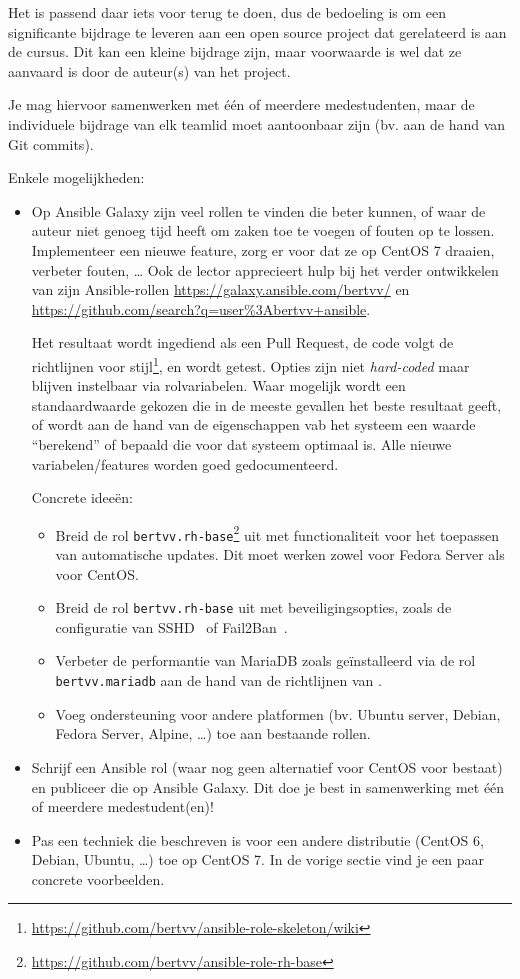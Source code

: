 Het is passend daar iets voor terug te doen, dus de bedoeling is om een significante bijdrage te leveren aan een open source project dat gerelateerd is aan de cursus. Dit kan een kleine bijdrage zijn, maar voorwaarde is wel dat ze aanvaard is door de auteur(s) van het project.

Je mag hiervoor samenwerken met één of meerdere medestudenten, maar de individuele bijdrage van elk teamlid moet aantoonbaar zijn (bv. aan de hand van Git commits).

Enkele mogelijkheden:

\begin{itemize}
\item Op Ansible Galaxy zijn veel rollen te vinden die beter kunnen, of waar de auteur niet genoeg tijd heeft om zaken toe te voegen of fouten op te lossen. Implementeer een nieuwe feature, zorg er voor dat ze op CentOS 7 draaien, verbeter fouten, \ldots{} Ook de lector apprecieert hulp bij het verder ontwikkelen van zijn Ansible-rollen \url{https://galaxy.ansible.com/bertvv/} en \url{https://github.com/search?q=user\%3Abertvv+ansible}.

  Het resultaat wordt ingediend als een Pull Request, de code volgt de richtlijnen voor stijl\footnote{\url{https://github.com/bertvv/ansible-role-skeleton/wiki}}, en wordt getest. Opties zijn niet \emph{hard-coded} maar blijven instelbaar via rolvariabelen. Waar mogelijk wordt een standaardwaarde gekozen die in de meeste gevallen het beste resultaat geeft, of wordt aan de hand van de eigenschappen vab het systeem een waarde ``berekend'' of bepaald die voor dat systeem optimaal is. Alle nieuwe variabelen/features worden goed gedocumenteerd.

  Concrete ideeën:

  \begin{itemize}
    \item Breid de rol \texttt{bertvv.rh-base}\footnote{\url{https://github.com/bertvv/ansible-role-rh-base}} uit met functionaliteit voor het toepassen van automatische updates. Dit moet werken zowel voor Fedora Server als voor CentOS.
    \item Breid de rol \texttt{bertvv.rh-base} uit met beveiligingsopties, zoals de configuratie van SSHD~\autocite{stribika2015,Maundalexis2016} of Fail2Ban~\autocite{Sawiyati2014}.
    \item Verbeter de performantie van MariaDB zoals geïnstalleerd via de rol \texttt{bertvv.mariadb} aan de hand van de richtlijnen van \textcite{Aun2016}.
    \item Voeg ondersteuning voor andere platformen (bv. Ubuntu server, Debian, Fedora Server, Alpine, \ldots) toe aan bestaande rollen.
  \end{itemize}

\item Schrijf een Ansible rol (waar nog geen alternatief voor CentOS voor bestaat) en publiceer die op Ansible Galaxy. Dit doe je best in samenwerking met één of meerdere medestudent(en)!
\item Pas een techniek die beschreven is voor een andere distributie (CentOS 6, Debian, Ubuntu, \ldots{}) toe op CentOS 7. In de vorige sectie vind je een paar concrete voorbeelden.
\end{itemize}

